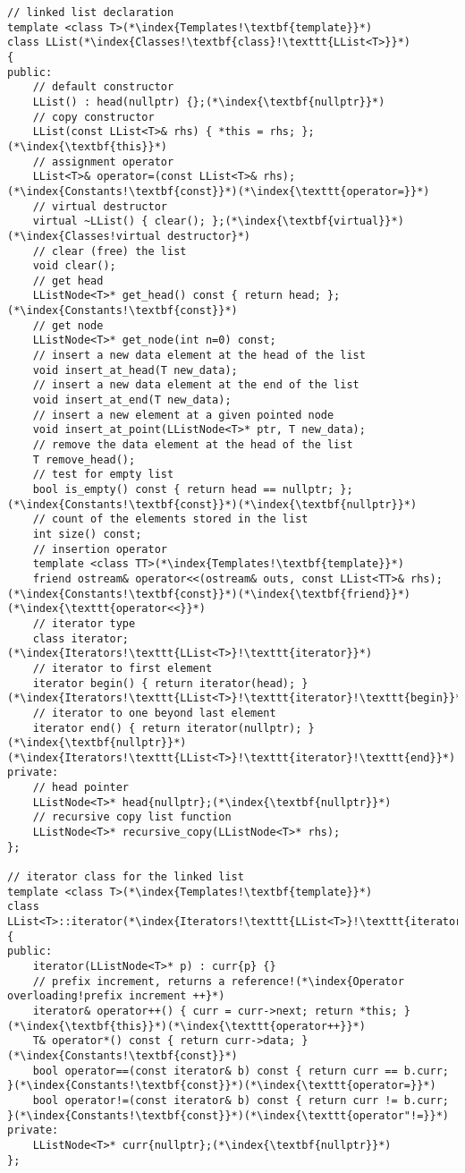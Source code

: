 \documentclass[10pt]{article}
\begin{document}
\begin{lstlisting}
// linked list declaration
template <class T>(*\index{Templates!\textbf{template}}*)
class LList(*\index{Classes!\textbf{class}!\texttt{LList<T>}}*)
{
public:
    // default constructor
    LList() : head(nullptr) {};(*\index{\textbf{nullptr}}*)
    // copy constructor
    LList(const LList<T>& rhs) { *this = rhs; };(*\index{\textbf{this}}*)
    // assignment operator
    LList<T>& operator=(const LList<T>& rhs);(*\index{Constants!\textbf{const}}*)(*\index{\texttt{operator=}}*)
    // virtual destructor
    virtual ~LList() { clear(); };(*\index{\textbf{virtual}}*)(*\index{Classes!virtual destructor}*)
    // clear (free) the list
    void clear();
    // get head
    LListNode<T>* get_head() const { return head; };(*\index{Constants!\textbf{const}}*)
    // get node
    LListNode<T>* get_node(int n=0) const;
    // insert a new data element at the head of the list
    void insert_at_head(T new_data);
    // insert a new data element at the end of the list
    void insert_at_end(T new_data);
    // insert a new element at a given pointed node
    void insert_at_point(LListNode<T>* ptr, T new_data);
    // remove the data element at the head of the list
    T remove_head();
    // test for empty list
    bool is_empty() const { return head == nullptr; };(*\index{Constants!\textbf{const}}*)(*\index{\textbf{nullptr}}*)
    // count of the elements stored in the list
    int size() const;
    // insertion operator
    template <class TT>(*\index{Templates!\textbf{template}}*)
    friend ostream& operator<<(ostream& outs, const LList<TT>& rhs);(*\index{Constants!\textbf{const}}*)(*\index{\textbf{friend}}*)(*\index{\texttt{operator<<}}*)
    // iterator type
    class iterator;(*\index{Iterators!\texttt{LList<T>}!\texttt{iterator}}*)
    // iterator to first element
    iterator begin() { return iterator(head); }(*\index{Iterators!\texttt{LList<T>}!\texttt{iterator}!\texttt{begin}}*)
    // iterator to one beyond last element
    iterator end() { return iterator(nullptr); }(*\index{\textbf{nullptr}}*)(*\index{Iterators!\texttt{LList<T>}!\texttt{iterator}!\texttt{end}}*)
private:
    // head pointer
    LListNode<T>* head{nullptr};(*\index{\textbf{nullptr}}*)
    // recursive copy list function
    LListNode<T>* recursive_copy(LListNode<T>* rhs);
};

// iterator class for the linked list
template <class T>(*\index{Templates!\textbf{template}}*)
class LList<T>::iterator(*\index{Iterators!\texttt{LList<T>}!\texttt{iterator}}*)
{
public:
    iterator(LListNode<T>* p) : curr{p} {}
    // prefix increment, returns a reference!(*\index{Operator overloading!prefix increment ++}*)
    iterator& operator++() { curr = curr->next; return *this; }(*\index{\textbf{this}}*)(*\index{\texttt{operator++}}*)
    T& operator*() const { return curr->data; }(*\index{Constants!\textbf{const}}*)
    bool operator==(const iterator& b) const { return curr == b.curr; }(*\index{Constants!\textbf{const}}*)(*\index{\texttt{operator=}}*)
    bool operator!=(const iterator& b) const { return curr != b.curr; }(*\index{Constants!\textbf{const}}*)(*\index{\texttt{operator"!=}}*)
private:
    LListNode<T>* curr{nullptr};(*\index{\textbf{nullptr}}*)
};


\end{lstlisting}
\end{document}

